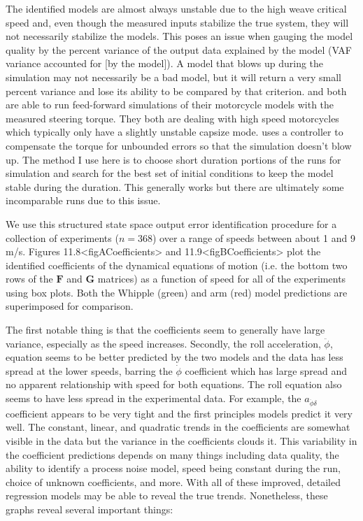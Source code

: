 \documentclass[a4paper]{article}
\begin{document}
The identified models are almost always unstable due to the high weave critical
speed and, even though the measured inputs stabilize the true system, they will
not necessarily stabilize the models. This poses an issue when gauging the
model quality by the percent variance of the output data explained by the model
(VAF variance accounted for [by the model]). A model that blows up during the
simulation may not necessarily be a bad model, but it will return a very small
percent variance and lose its ability to be compared by that criterion.
\cite{Biral2003} and \cite{Teerhuis2010} both are able to run feed-forward
simulations of their motorcycle models with the measured steering torque. They
both are dealing with high speed motorcycles which typically only have a
slightly unstable capsize mode. \cite{Teerhuis2010} uses a controller to
compensate the torque for unbounded errors so that the simulation doesn't blow
up. The method I use here is to choose short duration portions of the runs for
simulation and search for the best set of initial conditions to keep the model
stable during the duration. This generally works but there are ultimately some
incomparable runs due to this issue.

We use this structured state space output error identification procedure
for a collection of experiments ($n=368$) over a range of speeds between
about 1 and 9 m/s. Figures 11.8\textless{}figACoefficients\textgreater{}
and 11.9\textless{}figBCoefficients\textgreater{} plot the identified
coefficients of the dynamical equations of motion (i.e. the bottom two
rows of the $\mathbf{F}$ and $\mathbf{G}$ matrices) as a function of
speed for all of the experiments using box plots. Both the Whipple
(green) and arm (red) model predictions are superimposed for comparison.

The first notable thing is that the coefficients seem to generally have
large variance, especially as the speed increases. Secondly, the roll
acceleration, $\ddot{\phi}$, equation seems to be better predicted by
the two models and the data has less spread at the lower speeds, barring
the $\dot{\phi}$ coefficient which has large spread and no apparent
relationship with speed for both equations. The roll equation also seems
to have less spread in the experimental data. For example, the
$a_{\ddot{\phi}\delta}$ coefficient appears to be very tight and the
first principles models predict it very well. The constant, linear, and
quadratic trends in the coefficients are somewhat visible in the data
but the variance in the coefficients clouds it. This variability in the
coefficient predictions depends on many things including data quality,
the ability to identify a process noise model, speed being constant
during the run, choice of unknown coefficients, and more. With all of
these improved, detailed regression models may be able to reveal the
true trends. Nonetheless, these
graphs reveal several important things:
\end{document}
